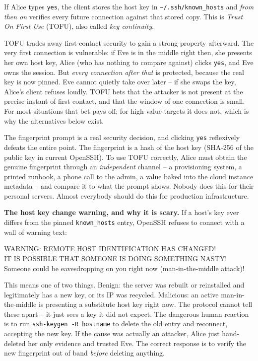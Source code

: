If Alice types \texttt{yes}, the client stores the host key in \texttt{\textasciitilde/.ssh/known\_hosts} and \emph{from then on} verifies every future connection against that stored copy. This is \emph{Trust On First Use} (TOFU), also called \emph{key continuity}.

\begin{intuitionbox}
TOFU trades away first-contact security to gain a strong property afterward. The very first connection is vulnerable: if Eve is in the middle right then, she presents her own host key, Alice (who has nothing to compare against) clicks \texttt{yes}, and Eve owns the session. But \emph{every connection after that} is protected, because the real key is now pinned. Eve cannot quietly take over later -- if she swaps the key, Alice's client refuses loudly. TOFU bets that the attacker is not present at the precise instant of first contact, and that the window of one connection is small. For most situations that bet pays off; for high-value targets it does not, which is why the alternatives below exist.
\end{intuitionbox}

\begin{trapbox}
The fingerprint prompt is a real security decision, and clicking \texttt{yes} reflexively defeats the entire point. The fingerprint is a hash of the host key (SHA-256 of the public key in current OpenSSH). To use TOFU correctly, Alice must obtain the genuine fingerprint through an \emph{independent} channel -- a provisioning system, a printed runbook, a phone call to the admin, a value baked into the cloud instance metadata -- and compare it to what the prompt shows. Nobody does this for their personal servers. Almost everybody should do this for production infrastructure.
\end{trapbox}

\begin{attackbox}
\textbf{The host key change warning, and why it is scary.} If a host's key ever differs from the pinned \texttt{known\_hosts} entry, OpenSSH refuses to connect with a wall of warning text:
\begin{center}\ttfamily
WARNING: REMOTE HOST IDENTIFICATION HAS CHANGED!\\
IT IS POSSIBLE THAT SOMEONE IS DOING SOMETHING NASTY!\\
Someone could be eavesdropping on you right now (man-in-the-middle attack)!
\end{center}
This means one of two things. Benign: the server was rebuilt or reinstalled and legitimately has a new key, or its IP was recycled. Malicious: an active man-in-the-middle is presenting a substitute host key right now. The protocol cannot tell these apart -- it just sees a key it did not expect. The dangerous human reaction is to run \texttt{ssh-keygen -R hostname} to delete the old entry and reconnect, accepting the new key. If the cause was actually an attacker, Alice just hand-deleted her only evidence and trusted Eve. The correct response is to verify the new fingerprint out of band \emph{before} deleting anything.
\end{attackbox}

